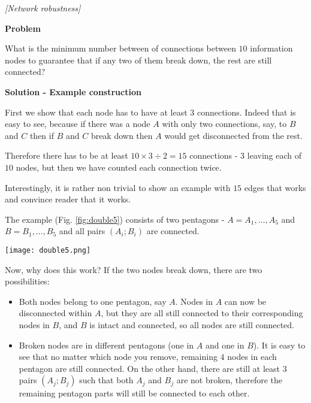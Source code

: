 \begin{problem}
\textit{[Network robustness]}

\textbf{Problem}

What is the minimum number between of connections between $10$ information nodes to guarantee that if any two of them break down, the rest are still connected? 

\textbf{Solution - Example construction}

First we show that each node has to have at least $3$ connections. Indeed that is easy to see, because if there was a node $A$ with only two connections, say, to $B$ and $C$ then if $B$ and $C$ break down then $A$ would get disconnected from the rest.

Therefore there has to be at least $10\times 3 \div 2 = 15$ connections - $3$ leaving each of $10$ nodes, but then we have counted each connection twice. 

Interestingly, it is rather non trivial to show an example with $15$ edges that works and convince reader that it works. 

The example (Fig. \ref{fig:double5}) consists of two pentagons - $A=A_1,\dots, A_5$ and $B=B_1,\dots,B_5$ and all pairs $(A_i;B_i)$ are connected.
\begin{center}
\texttt{[image: double5.png]}
\label{fig:double5}
\end{center} 

Now, why does this work? 
If the two nodes break down, there are two possibilities:
\begin{itemize}
\item Both nodes belong to one pentagon, say $A$. Nodes in $A$ can now be disconnected within $A$, but they are all still connected to their corresponding nodes in $B$, and $B$ is intact and connected, so all nodes are still connected.
\item Broken nodes are in different pentagons (one in $A$ and one in $B$). It is easy to see that no matter which node you remove, remaining $4$ nodes in each pentagon are still connected. On the other hand, there are still at least $3$ pairs $(A_j;B_j)$ such that both $A_j$ and $B_j$ are not broken, therefore the remaining pentagon parts will still be connected to each other.
\end{itemize}

\end{problem}
%
\filbreak


